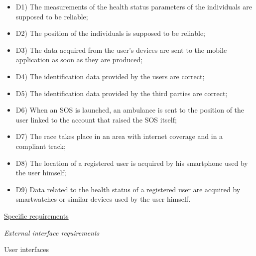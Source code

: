 \documentclass{article}
\begin{document}
\begin{legal}
\begin{legal}
\begin{legal}
			{\normalfont
				\begin{itemize}
				\item D1) The measurements of the health status parameters of the individuals are supposed to be reliable;\\
				\item D2) The position of the individuals is supposed to be reliable;\\
				\item D3) The data acquired from the user’s devices are sent to the mobile application as soon as they are produced;\\
				\item D4) The identification data provided by the users are correct;\\
				\item D5) The identification data provided by the third parties are correct;\\
				\item D6) When an SOS is launched, an ambulance is sent to the position of the user linked to the account that raised the SOS itself;\\
				\item D7) The race takes place in an area with internet coverage and in a compliant track;\\
				\item D8) The location of a registered user is acquired by his smartphone used by the user himself;\\
				\item D9) Data related to the health status of a registered user are acquired by smartwatches or similar devices used by the user himself.\\
				\end{itemize}
			}
			\end{legal}
		\end{legal}
	
\newpage
	\item \underline{Specific requirements}
  		\begin{legal}
		\item \textit{External interface requirements}
			\begin{legal}
    		\item User interfaces \\\\
			\normalfont{
			In this section follow the main mockups that represent a basic idea of what the mobile app will look like in the first release:%

}
\end{legal}
\end{legal}
\end{legal}
\end{document}
